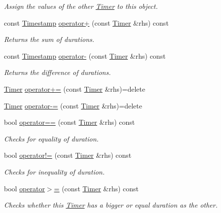 \begin{DoxyCompactItemize}
\begin{DoxyCompactList}\small\item\em Assign the values of the other \hyperlink{class_timer}{Timer} to this object. \end{DoxyCompactList}\item 
const \hyperlink{class_timestamp}{Timestamp} \hyperlink{class_timer_a71b986fae4c288f097c76fae1f44e00f}{operator+} (const \hyperlink{class_timer}{Timer} \&rhs) const 
\begin{DoxyCompactList}\small\item\em Returns the sum of durations. \end{DoxyCompactList}\item 
const \hyperlink{class_timestamp}{Timestamp} \hyperlink{class_timer_aa05f4e4b1afcb3378c4a99f9c979fae3}{operator-\/} (const \hyperlink{class_timer}{Timer} \&rhs) const 
\begin{DoxyCompactList}\small\item\em Returns the difference of durations. \end{DoxyCompactList}\item 
\hyperlink{class_timer}{Timer} \hyperlink{class_timer_a2ceb9229280ad776ac89df6c4658e729}{operator+=} (const \hyperlink{class_timer}{Timer} \&rhs)=delete
\item 
\hyperlink{class_timer}{Timer} \hyperlink{class_timer_ac9ad0dc17b6d149fb56191282a4a3593}{operator-\/=} (const \hyperlink{class_timer}{Timer} \&rhs)=delete
\item 
bool \hyperlink{class_timer_ab5775d36312c20e4ae655afdf1bc5b11}{operator==} (const \hyperlink{class_timer}{Timer} \&rhs) const 
\begin{DoxyCompactList}\small\item\em Checks for equality of duration. \end{DoxyCompactList}\item 
bool \hyperlink{class_timer_add251d78040374a0355bf894c7372f49}{operator!=} (const \hyperlink{class_timer}{Timer} \&rhs) const 
\begin{DoxyCompactList}\small\item\em Checks for inequality of duration. \end{DoxyCompactList}\item 
bool \hyperlink{class_timer_a448bc622243401c737a216a9e9b65a80}{operator$>$=} (const \hyperlink{class_timer}{Timer} \&rhs) const 
\begin{DoxyCompactList}\small\item\em Checks whether this \hyperlink{class_timer}{Timer} has a bigger or equal duration as the other. \end{DoxyCompactList}\item 

\end{DoxyCompactItemize}
